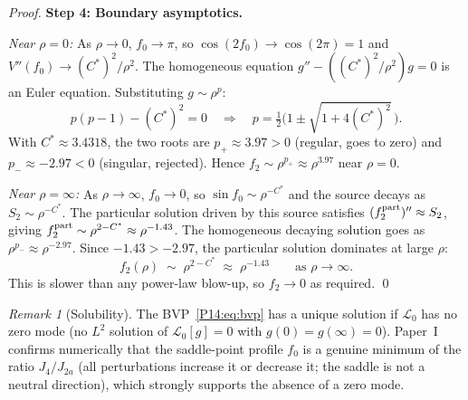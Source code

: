 \documentclass[11pt,a4paper]{article}
\theoremstyle{definition}
\theoremstyle{remark}
\newtheorem{remark}[theorem]{Remark}
\newcommand{\Jfour}{J_4}
\newcommand{\Ja}{J_{2a}}
\newcommand{\Cstar}{C^*}
\newcommand{\fzero}{f_0}
\newcommand{\ftwo}{f_2}
\newcommand{\Ltwo}{\mathcal{L}_0}
\newcommand{\Stwo}{S_2}
\begin{document}
\begin{proof}
\textbf{Step 4: Boundary asymptotics.}

\emph{Near $\rho=0$:} As $\rho\to0$, $\fzero\to\pi$, so
$\cos(2\fzero)\to\cos(2\pi)=1$ and $V''(\fzero)\to({C^*})^2/\rho^2$.
The homogeneous equation $g''-(({C^*})^2/\rho^2)g=0$ is an Euler equation.
Substituting $g\sim\rho^p$:
\begin{equation}
  p(p-1) - ({C^*})^2 = 0
  \quad\Longrightarrow\quad
  p = \tfrac{1}{2}\bigl(1\pm\sqrt{1+4({C^*})^2}\,\bigr).
  \label{P14:eq:indicial}
\end{equation}
With $\Cstar\approx3.4318$, the two roots are $p_+\approx3.97>0$
(regular, goes to zero) and $p_-\approx-2.97<0$ (singular, rejected).
Hence $\ftwo\sim\rho^{p_+}\approx\rho^{3.97}$ near $\rho=0$.

\emph{Near $\rho=\infty$:} As $\rho\to\infty$, $\fzero\to0$, so
$\sin\fzero\sim\rho^{-\Cstar}$ and the source decays as
$\Stwo\sim\rho^{-\Cstar}$.
The particular solution driven by this source satisfies
$(\ftwo^{\rm part})''\approx\Stwo$, giving
$\ftwo^{\rm part}\sim\rho^{2-\Cstar}\approx\rho^{-1.43}$.
The homogeneous decaying solution goes as $\rho^{p_-}\approx\rho^{-2.97}$.
Since $-1.43>-2.97$, the particular solution dominates at large $\rho$:
\begin{equation}
  \ftwo(\rho) \;\sim\; \rho^{2-\Cstar} \;\approx\; \rho^{-1.43}
  \qquad\text{as }\rho\to\infty.
  \label{P14:eq:large_rho_asym}
\end{equation}
This is slower than any power-law blow-up, so $\ftwo\to0$ as required.
\qed
\end{proof}

\begin{remark}[Solubility]
\label{P14:rem:solubility}
The BVP~\eqref{P14:eq:bvp} has a unique solution if $\Ltwo$ has no zero mode
(no $L^2$ solution of $\Ltwo[g]=0$ with $g(0)=g(\infty)=0$).
Paper~I~\cite{Paper1} confirms numerically that the saddle-point profile
$\fzero$ is a genuine minimum of the ratio $\Jfour/\Ja$ (all perturbations
increase it or decrease it; the saddle is not a neutral direction),
which strongly supports the absence of a zero mode.
\end{remark}
\end{document}
